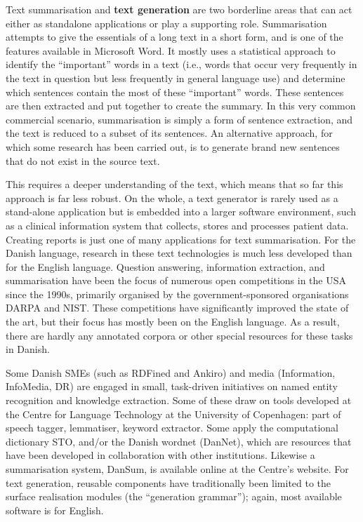 \begin{multicols}{2}
    Text summarisation and \textbf{text generation} are two borderline areas that can act either as standalone applications or play a supporting role. Summarisation attempts to give the essentials of a long text in a short form, and is one of the features available in Microsoft Word. It mostly uses a statistical approach to identify the “important” words in a text (i.e., words that occur very frequently in the text in question but less frequently in general language use) and determine which sentences contain the most of these “important” words. These sentences are then extracted and put together to create the summary. In this very common commercial scenario, summarisation is simply a form of sentence extraction, and the text is reduced to a subset of its sentences. An alternative approach, for which some research has been carried out, is to generate brand new sentences that do not exist in the source text. 


This requires a deeper understanding of the text, which means that so far this approach is far less robust. On the whole, a text generator is rarely used as a stand-alone application but is embedded into a larger software environment, such as a clinical information system that collects, stores and processes patient data. Creating reports is just one of many applications for text summarisation. 
For the Danish language, research in these text technologies is much less developed than for the Eng\-lish language. Question answering, information extraction, and summarisation have been the focus of numerous open competitions in the USA since the 1990s, primarily organised by the government-sponsored organisations DARPA and NIST. These competitions have significantly improved the state of the art, but their focus has mostly been on the English language. As a result, there are hardly any annotated corpora or other special resources for these tasks in Danish. 

Some Danish SMEs (such as RDFined and Ankiro) and media (Information, InfoMedia, DR) 
are engaged in small, task-driven initiatives on named entity recognition and knowledge extraction.  Some of these draw on tools developed at the Centre for Language Technology at the University of Copenhagen: part of speech tagger, lemmatiser, keyword extractor.  Some apply the computational dictionary STO, and/or the Danish wordnet (DanNet), which are resources that have been developed in collaboration with other institutions. Likewise a summarisation system, DanSum, is available online at the Centre's website.  For text generation, reusable components have traditionally been limited to the surface realisation modules (the “generation grammar”); again, most available software is for English. 



\end{multicols}
